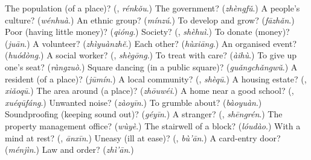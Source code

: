 \begin{tcolorbox}[breakable,colback=teal!4,colframe=teal!35!black,title={Before you move on}]
The population (of a place)? (\textbf{}, \emph{rénkǒu}.) The government? (\emph{zhèngfǔ}.) A people's culture? (\emph{wénhuà}.) An ethnic group? (\emph{mínzú}.) To develop and grow? (\emph{fāzhǎn}.) Poor (having little money)? (\emph{qióng}.) Society? (\textbf{}, \emph{shèhuì}.) To donate (money)? (\emph{juān}.) A volunteer? (\emph{zhìyuànzhě}.) Each other? (\emph{hùxiāng}.) An organised event? (\emph{huódòng}.) A social worker? (\textbf{}, \emph{shègōng}.) To treat with care? (\emph{àihù}.) To give up one's seat? (\emph{ràngzuò}.) Square dancing (in a public square)? (\emph{guǎngchǎngwǔ}.) A resident (of a place)? (\emph{jūmín}.) A local community? (\textbf{}, \emph{shèqū}.) A housing estate? (\textbf{}, \emph{xiǎoqū}.) The area around (a place)? (\emph{zhōuwéi}.) A home near a good school? (\textbf{}, \emph{xuéqūfáng}.) Unwanted noise? (\emph{zàoyīn}.) To grumble about? (\emph{bàoyuàn}.) Soundproofing (keeping sound out)? (\emph{géyīn}.) A stranger? (\textbf{}, \emph{shēngrén}.) The property management office? (\emph{wùyè}.) The stairwell of a block? (\emph{lóudào}.) With a mind at rest? (\textbf{}, \emph{ānxīn}.) Uneasy (ill at ease)? (\textbf{}, \emph{bù'ān}.) A card-entry door? (\emph{ménjìn}.) Law and order? (\emph{zhì'ān}.)
\end{tcolorbox}
